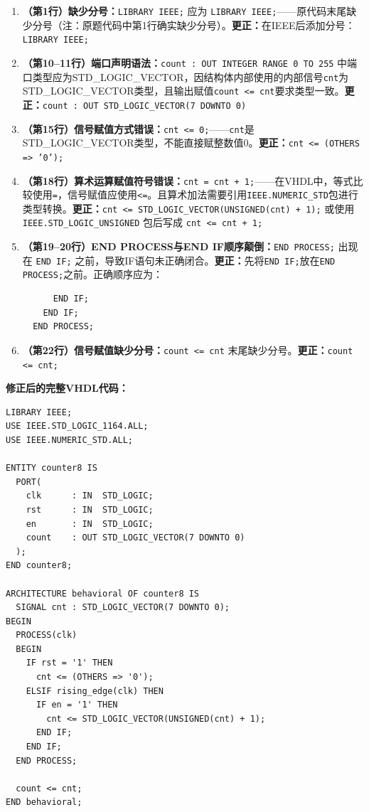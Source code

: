 \begin{enumerate}[label=\textbf{错误\arabic*：}, leftmargin=*]

\item \textbf{（第1行）缺少分号：}\texttt{LIBRARY IEEE;} 应为 \texttt{LIBRARY IEEE;}——原代码末尾缺少分号（注：原题代码中第1行确实缺少分号）。\textbf{更正：}在IEEE后添加分号：\texttt{LIBRARY IEEE;}

\item \textbf{（第10--11行）端口声明语法：}\texttt{count : OUT INTEGER RANGE 0 TO 255} 中端口类型应为STD\_LOGIC\_VECTOR，因结构体内部使用的内部信号\texttt{cnt}为STD\_LOGIC\_VECTOR类型，且输出赋值\texttt{count <= cnt}要求类型一致。\textbf{更正：}\texttt{count : OUT STD\_LOGIC\_VECTOR(7 DOWNTO 0)}

\item \textbf{（第15行）信号赋值方式错误：}\texttt{cnt <= 0;}——\texttt{cnt}是STD\_LOGIC\_VECTOR类型，不能直接赋整数值0。\textbf{更正：}\texttt{cnt <= (OTHERS => '0');}

\item \textbf{（第18行）算术运算赋值符号错误：}\texttt{cnt = cnt + 1;}——在VHDL中，等式比较使用\texttt{=}，信号赋值应使用\texttt{<=}。且算术加法需要引用\texttt{IEEE.NUMERIC\_STD}包进行类型转换。\textbf{更正：}\texttt{cnt <= STD\_LOGIC\_VECTOR(UNSIGNED(cnt) + 1);} 或使用 \texttt{IEEE.STD\_LOGIC\_UNSIGNED} 包后写成 \texttt{cnt <= cnt + 1;}

\item \textbf{（第19--20行）END PROCESS与END IF顺序颠倒：}\texttt{END PROCESS;} 出现在 \texttt{END IF;} 之前，导致IF语句未正确闭合。\textbf{更正：}先将\texttt{END IF;}放在\texttt{END PROCESS;}之前。正确顺序应为：
\begin{verbatim}
      END IF;
    END IF;
  END PROCESS;
\end{verbatim}

\item \textbf{（第22行）信号赋值缺少分号：}\texttt{count <= cnt} 末尾缺少分号。\textbf{更正：}\texttt{count <= cnt;}

\end{enumerate}

\textbf{修正后的完整VHDL代码：}

\begin{lstlisting}[caption={修正后的8位计数器VHDL代码}]
LIBRARY IEEE;
USE IEEE.STD_LOGIC_1164.ALL;
USE IEEE.NUMERIC_STD.ALL;

ENTITY counter8 IS
  PORT(
    clk      : IN  STD_LOGIC;
    rst      : IN  STD_LOGIC;
    en       : IN  STD_LOGIC;
    count    : OUT STD_LOGIC_VECTOR(7 DOWNTO 0)
  );
END counter8;

ARCHITECTURE behavioral OF counter8 IS
  SIGNAL cnt : STD_LOGIC_VECTOR(7 DOWNTO 0);
BEGIN
  PROCESS(clk)
  BEGIN
    IF rst = '1' THEN
      cnt <= (OTHERS => '0');
    ELSIF rising_edge(clk) THEN
      IF en = '1' THEN
        cnt <= STD_LOGIC_VECTOR(UNSIGNED(cnt) + 1);
      END IF;
    END IF;
  END PROCESS;

  count <= cnt;
END behavioral;
\end{lstlisting}

